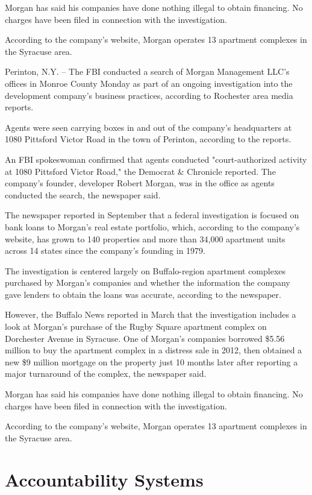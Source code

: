 \documentclass[../../main/main.tex]{subfiles}
\begin{document}
Morgan has said his companies have done nothing illegal to obtain financing. No charges have been filed in connection with the investigation. 

According to the company's website, Morgan operates 13 apartment complexes in the Syracuse area.

Perinton, N.Y. -- The FBI conducted a search of Morgan Management LLC's offices in Monroe County Monday as part of an ongoing investigation into the development company's business practices, according to Rochester area media reports.

Agents were seen carrying boxes in and out of the company's headquarters at 1080 Pittsford Victor Road in the town of Perinton, according to the reports.

An FBI spokeswoman confirmed that agents conducted "court-authorized activity at 1080 Pittsford Victor Road," the Democrat \& Chronicle reported. The company's founder, developer Robert Morgan, was in the office as agents conducted the search, the newspaper said.

The newspaper reported in September that a federal investigation is focused on bank loans to Morgan's real estate portfolio, which, according to the company's website, has grown to 140 properties and more than 34,000 apartment units across 14 states since the company's founding in 1979.

The investigation is centered largely on Buffalo-region apartment complexes purchased by Morgan's companies and whether the information the company gave lenders to obtain the loans was accurate, according to the newspaper.

However, the Buffalo News reported in March that the investigation includes a look at Morgan's purchase of the Rugby Square apartment complex on Dorchester Avenue in Syracuse.  One of Morgan's companies borrowed \$5.56 million to buy the apartment complex in a distress sale in 2012, then obtained a new \$9 million mortgage on the property just 10 months later after reporting a major turnaround of the complex, the newspaper said.

Morgan has said his companies have done nothing illegal to obtain financing. No charges have been filed in connection with the investigation. 

According to the company's website, Morgan operates 13 apartment complexes in the Syracuse area.
\section{Accountability Systems}\label{sec:accountability}
\end{document}

